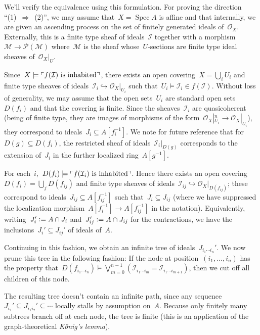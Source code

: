 \documentclass[10pt,reqno,a4paper]{amsbook}
\makeatletter
\theoremstyle{definition}
\theoremstyle{plain}
\theoremstyle{remark}
\let\acuteH\H
\newcommand{\konig}{K\acuteH onig}
\renewcommand{\H}{\mathcal{H}}
\renewcommand{\O}{\mathcal{O}}
\newcommand{\M}{\mathcal{M}}
\renewcommand{\P}{\mathcal{P}}
\newcommand{\I}{\mathcal{I}}
\DeclareMathOperator{\Spec}{Spec}
\newcommand{\?}{\,{:}\,}
\renewcommand{\_}{\mathpunct{.}\,}
\newcommand{\speak}[1]{\ulcorner\text{\textnormal{#1}}\urcorner}
\newcommand{\defeq}{\vcentcolon=}
\renewenvironment{proof}[1][\proofname]{\par
  \pushQED{\qed}%
  \normalfont \topsep6\p@\@plus6\p@\relax
  \trivlist
  \item[\hskip\labelsep
        \itshape
    #1\@addpunct{.}]\ignorespaces
}{%
  \popQED\endtrivlist\@endpefalse
}
\makeatother
\begin{document}
{\begin{proof}
We'll verify the equivalence using this formulation. For proving the
direction ``(1)~$\Rightarrow$~(2)'', we may assume that~$X =
\Spec A$ is affine and that internally, we are given an
ascending process on the set of finitely generated ideals of~$\O_X$.
Externally, this is a finite type sheaf of ideals~$\I$ together with a morphism~$\M
\to \P(\M)$ where~$\M$ is the sheaf whose~$U$-sections are finite type ideal
sheaves of~$\O_X|_U$.

Since~$X \models \speak{$f(\I)$ is inhabited}$, there exists an open covering~$X
= \bigcup_i U_i$ and finite type sheaves of ideals~$\I_i \hookrightarrow
\O_X|_{U_i}$ such that~$U_i \models \I_i \in f(\I)$. Without loss of generality,
we may assume that the open sets~$U_i$ are standard open sets~$D(f_i)$ and that
the covering is finite. Since the sheaves~$\I_i$ are quasicoherent (being of
finite type, they are images of morphisms of the form~$\O_X|_{U_i}^n \to
\O_X|_{U_i}$), they correspond to ideals~$J_i \subseteq A[f_i^{-1}]$. We note for future reference
that for~$D(g) \subseteq D(f_i)$, the restricted sheaf of ideals~$\I_i|_{D(g)}$
corresponds to the extension of~$J_i$ in the further
localized ring~$A[g^{-1}]$.

For each~$i$,~$D(f_i) \models \speak{$f(\I_i)$ is inhabited}$.
Hence there exists an open covering~$D(f_i) = \bigcup_j D(f_{ij})$ and finite
type sheaves of ideals~$\I_{ij} \hookrightarrow \O_X|_{D(f_{ij})}$; these
correspond to ideals~$J_{ij} \subseteq A[f_{ij}^{-1}]$ such that~$J_i
\subseteq J_{ij}$ (where we have suppressed the localization
morphism~$A[f_i^{-1}] \to A[f_{ij}^{-1}]$ in the notation). Equivalently,
writing~$J_i' \defeq A \cap J_i$ and~$J_{ij}' \defeq A \cap J_{ij}$ for the
contractions, we have the inclusions~$J_i' \subseteq J_{ij}'$ of ideals of~$A$.

Continuing in this fashion, we obtain an infinite tree of ideals~$J_{i_1 \cdots i_n}'$.
We now prune this tree in the following fashion: If the node at position~$(i_1,
\ldots, i_n)$ has the property that~$D(f_{i_1 \cdots i_n}) \models
\bigvee_{m=0}^{n-1} (\I_{i_1 \cdots i_m} = \I_{i_1 \cdots i_{m+1}})$, then we cut
off all children of this node.

The resulting tree doesn't contain an infinite path, since any
sequence~$J_{i_1}' \subseteq J_{i_1 i_2}' \subseteq \cdots$ locally stalls by
assumption on~$A$. Because only finitely many subtrees branch off at each node,
the tree is finite (this is an application of the graph-theoretical
\emph{\konig's lemma}).


\end{proof}}
\end{document}
